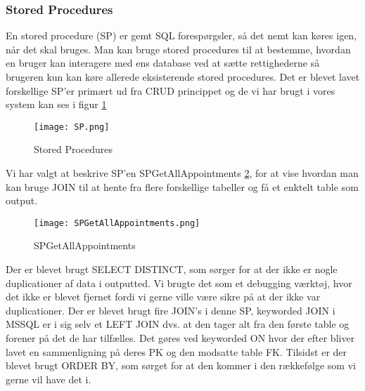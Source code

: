 \subsubsection{Stored Procedures}
En stored procedure (SP) er gemt SQL forespørgsler, så det nemt kan køres igen, når det skal bruges.
Man kan bruge stored procedures til at bestemme, hvordan en bruger kan interagere med ens database ved at sætte rettighederne så brugeren kun kan køre allerede eksisterende stored procedures.
Det er blevet lavet forskellige SP'er primært ud fra CRUD princippet og de vi har brugt i vores system kan ses i figur \ref{StoredProcedures}

\begin{figure}[h]
    \caption{Stored Procedures}
    \centering
        \texttt{[image: SP.png]}
    \label{StoredProcedures}
\end{figure}

Vi har valgt at beskrive SP'en SPGetAllAppointments \ref{SPGetAllAppointments}, for at vise hvordan man kan bruge JOIN til at hente fra flere forskellige tabeller og få et enktelt table som output.

\begin{figure}[h]
    \caption{SPGetAllAppointments}
    \centering
        \texttt{[image: SPGetAllAppointments.png]}
    \label{SPGetAllAppointments}
\end{figure}

Der er blevet brugt SELECT DISTINCT, som sørger for at der ikke er nogle duplicationer af data i outputted. Vi brugte det som et debugging værktøj, hvor det ikke er blevet fjernet fordi vi gerne ville være sikre på at der ikke var duplicationer.
Der er blevet brugt fire JOIN's i denne SP, keyworded JOIN i MSSQL er i sig selv et LEFT JOIN dvs. at den tager alt fra den første table og forener på det de har tilfælles. Det gøres ved keyworded ON hvor der efter bliver lavet en sammenligning på deres PK og den modsatte table FK.
Tilsidst er der blevet brugt ORDER BY, som sørget for at den kommer i den rækkefølge som vi gerne vil have det i.


